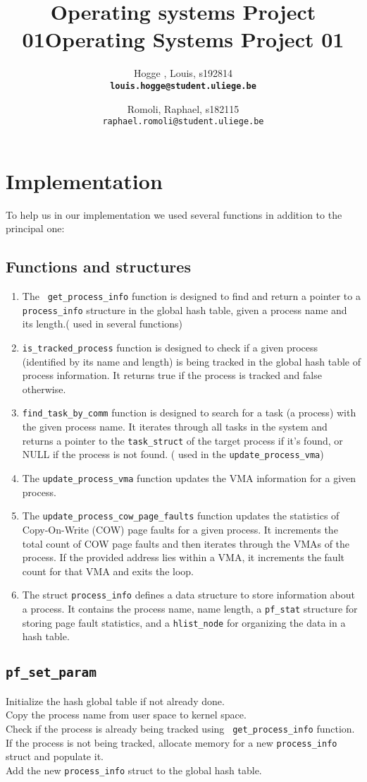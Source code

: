 \documentclass{article}
\title{Operating systems Project 01}
\author{
  Hogge , Louis, s192814 \\
  \texttt{\textbf{louis.hogge@student.uliege.be}}
  \and
  Romoli, Raphael, s182115\\
  \texttt{raphael.romoli@student.uliege.be}
}
\title{Operating Systems Project 01}
\date{}
\begin{document}
  \maketitle
  \section{Implementation}
  To help us in our implementation we used several functions in addition to the principal one:
  \subsection{Functions and structures}
    \begin{enumerate}
        \item The \texttt{ get\_process\_info} function is designed to find and return a pointer to a \texttt{process\_info} structure in the global hash table, given a process name and its length.( used in several functions)
        \item \texttt{is\_tracked\_process} function is designed to check if a given process (identified by its name and length) is being tracked in the global hash table of process information. It returns true if the process is tracked and false otherwise.
        \item \texttt{find\_task\_by\_comm} function is designed to search for a task (a process) with the given process name. It iterates through all tasks in the system and returns a pointer to the \texttt{task\_struct} of the target process if it's found, or NULL if the process is not found. ( used in the \texttt{update\_process\_vma})
        \item  The \texttt{update\_process\_vma} function updates the VMA information for a given process.
        \item  The \texttt{update\_process\_cow\_page\_faults} function updates the statistics of Copy-On-Write (COW) page faults for a given process. It increments the total count of COW page faults and then iterates through the VMAs of the process. If the provided address lies within a VMA, it increments the fault count for that VMA and exits the loop.
        \item The struct \texttt{process\_info} defines a data structure to store information about a process. It contains the process name, name length, a \texttt{pf\_stat} structure for storing page fault statistics, and a \texttt{hlist\_node} for organizing the data in a hash table.
    \end{enumerate}   
  \subsection{\texttt{pf\_set\_param}}
    Initialize the hash global table if not already done. \\Copy the process name from user space to kernel space. \\Check if the process is already being tracked using \texttt{ get\_process\_info} function.\\ If the process is not being tracked, allocate memory for a new \texttt{process\_info} struct and populate it. \\Add the new \texttt{process\_info} struct to the global hash table.
\end{document}
